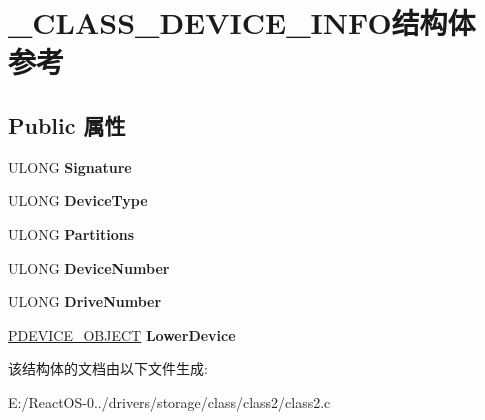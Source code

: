 \hypertarget{struct___c_l_a_s_s___d_e_v_i_c_e___i_n_f_o}{}\section{\+\_\+\+C\+L\+A\+S\+S\+\_\+\+D\+E\+V\+I\+C\+E\+\_\+\+I\+N\+F\+O结构体 参考}
\label{struct___c_l_a_s_s___d_e_v_i_c_e___i_n_f_o}
\subsection*{Public 属性}
\begin{DoxyCompactItemize}
\item 
\mbox{\label{struct___c_l_a_s_s___d_e_v_i_c_e___i_n_f_o_ac7670f80395c86780509f1a9d816753e}} 
U\+L\+O\+NG {\bfseries Signature}
\item 
\mbox{\label{struct___c_l_a_s_s___d_e_v_i_c_e___i_n_f_o_a158c2a55aa5e155a4daef020df2a97c0}} 
U\+L\+O\+NG {\bfseries Device\+Type}
\item 
\mbox{\label{struct___c_l_a_s_s___d_e_v_i_c_e___i_n_f_o_a0769a53a3d8c1bfe80da23bad0941f15}} 
U\+L\+O\+NG {\bfseries Partitions}
\item 
\mbox{\label{struct___c_l_a_s_s___d_e_v_i_c_e___i_n_f_o_a8101980d742d9dc8a9ceddee692f49df}} 
U\+L\+O\+NG {\bfseries Device\+Number}
\item 
\mbox{\label{struct___c_l_a_s_s___d_e_v_i_c_e___i_n_f_o_aff00ec78d8a0c6a1e9ca97511cffb33b}} 
U\+L\+O\+NG {\bfseries Drive\+Number}
\item 
\mbox{\label{struct___c_l_a_s_s___d_e_v_i_c_e___i_n_f_o_af6cabc1f858f07d3b00d30d13d1e66ee}} 
\hyperlink{struct___d_e_v_i_c_e___o_b_j_e_c_t}{P\+D\+E\+V\+I\+C\+E\+\_\+\+O\+B\+J\+E\+CT} {\bfseries Lower\+Device}
\end{DoxyCompactItemize}


该结构体的文档由以下文件生成\+:\begin{DoxyCompactItemize}
\item 
E\+:/\+React\+O\+S-\/0../drivers/storage/class/class2/class2.\+c\end{DoxyCompactItemize}
